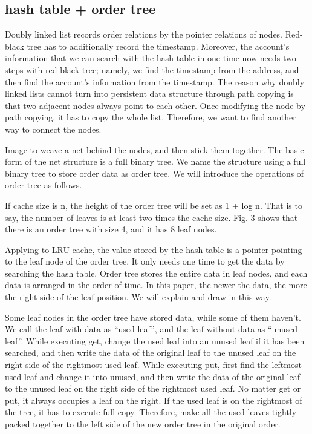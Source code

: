 \documentclass[conference]{IEEEtran}
\begin{document}
\subsection{hash table + order tree}
Doubly linked list records order relations by the pointer relations of nodes. Red-black tree has to additionally record the timestamp. Moreover, the account’s information that we can search with the hash table in one time now needs two steps with red-black tree; namely, we find the timestamp from the address, and then find the account's information from the timestamp.
The reason why doubly linked lists cannot turn into persistent data structure through path copying is that two adjacent nodes always point to each other. Once modifying the node by path copying, it has to copy the whole list. Therefore, we want to find another way to connect the nodes.

Image to weave a net behind the nodes, and then stick them together.
The basic form of the net structure is a full binary tree. We name the structure using a full binary tree to store order data as order tree. We will introduce the operations of order tree as follows.

If cache size is n, the height of the order tree will be set as 1 + log n. That is to say, the number of leaves is at least two times the cache size. Fig. 3 shows that there is an order tree with size 4, and it has 8 leaf nodes.

Applying to LRU cache, the value stored by the hash table is a pointer pointing to the leaf node of the order tree. It only needs one time to get the data by searching the hash table. 
Order tree stores the entire data in leaf nodes, and each data is arranged in the order of time. In this paper, the newer the data, the more the right side of the leaf position. We will explain and draw in this way.

Some leaf nodes in the order tree have stored data, while some of them haven’t. We call the leaf with data as “used leaf”, and the leaf without data as “unused leaf”.
While executing get, change the used leaf into an unused leaf if it has been searched, and then write the data of the original leaf to the unused leaf on the right side of the rightmost used leaf. While executing put, first find the leftmost used leaf and change it into unused, and then write the data of the original leaf to the unused leaf on the right side of the rightmost used leaf. No matter get or put, it always occupies a leaf on the right. If the used leaf is on the rightmost of the tree, it has to execute full copy. Therefore, make all the used leaves tightly packed together to the left side of the new order tree in the original order.
\end{document}
